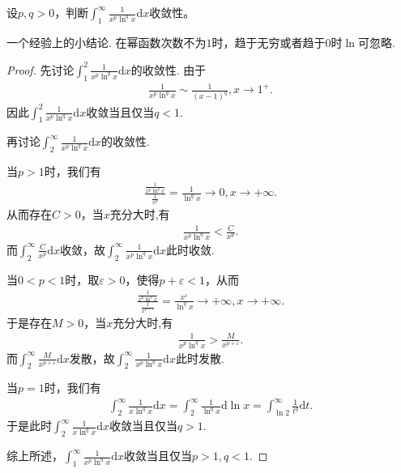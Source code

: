 \documentclass[../../main.tex]{subfiles}%
\begin{document}
\begin{example}
设\(p,q > 0\)，判断\(\int_{1}^{\infty}\frac{1}{x^p\ln^q x}\mathrm{d}x\)收敛性。 
\end{example}
\begin{note}
一个经验上的小结论. 在幂函数次数不为\(1\)时，趋于无穷或者趋于\(0\)时\(\ln\)可忽略.
\end{note}
\begin{proof}

先讨论\(\int_{1}^{2}\frac{1}{x^p\ln ^q x}\mathrm{d}x\)的收敛性. 由于
\begin{align*}
\frac{1}{x^p\ln ^q x}\sim\frac{1}{(x - 1)^q},x\rightarrow 1^+.
\end{align*}
因此\(\int_{1}^{2}\frac{1}{x^p\ln ^q x}\mathrm{d}x\)收敛当且仅当\(q < 1\).

再讨论\(\int_{2}^{\infty}\frac{1}{x^p\ln ^q x}\mathrm{d}x\)的收敛性.

\one 当\(p > 1\)时，我们有
\begin{align*}
\frac{\frac{1}{x^p\ln ^q x}}{\frac{1}{x^p}}=\frac{1}{\ln ^q x}\rightarrow 0,x\rightarrow +\infty.
\end{align*}
从而存在\(C > 0\)，当$x$充分大时,有
\begin{align*}
\frac{1}{x^p\ln ^q x}<\frac{C}{x^p}.
\end{align*}
而\(\int_{2}^{\infty}\frac{C}{x^p}\mathrm{d}x\)收敛，故\(\int_{2}^{\infty}\frac{1}{x^p\ln ^q x}\mathrm{d}x\)此时收敛.

\two 当\(0 < p < 1\)时，取\(\varepsilon > 0\)，使得\(p + \varepsilon < 1\)，从而
\begin{align*}
\frac{\frac{1}{x^p\ln ^q x}}{\frac{1}{x^{p + \varepsilon}}}=\frac{x^{\varepsilon}}{\ln ^q x}\rightarrow +\infty,x\rightarrow +\infty.
\end{align*}
于是存在\(M > 0\)，当$x$充分大时,有
\begin{align*}
\frac{1}{x^p\ln ^q x}>\frac{M}{x^{p + \varepsilon}}.
\end{align*}
而\(\int_{2}^{\infty}\frac{M}{x^{p + \varepsilon}}\mathrm{d}x\)发散，故\(\int_{2}^{\infty}\frac{1}{x^p\ln ^q x}\mathrm{d}x\)此时发散.

\three 当\(p = 1\)时，我们有
\begin{align*}
\int_{2}^{\infty}\frac{1}{x\ln ^q x}\mathrm{d}x=\int_{2}^{\infty}\frac{1}{\ln ^q x}\mathrm{d}\ln x=\int_{\ln 2}^{\infty}\frac{1}{t^q}\mathrm{d}t.
\end{align*}
于是此时\(\int_{2}^{\infty}\frac{1}{x\ln ^q x}\mathrm{d}x\)收敛当且仅当\(q > 1\).

综上所述，\(\int_{1}^{\infty}\frac{1}{x^p\ln ^q x}\mathrm{d}x\)收敛当且仅当\(p > 1,q < 1\). 
\end{proof}
\end{document}
